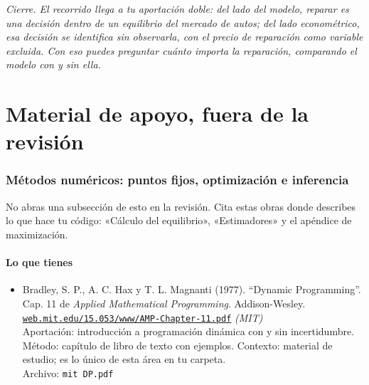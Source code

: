 \documentclass[11pt]{article}
\begin{document}
\medskip
\noindent\textit{Cierre. El recorrido llega a tu aportación doble: del lado del modelo, reparar es una decisión dentro de un equilibrio del mercado de autos; del lado econométrico, esa decisión se identifica sin observarla, con el precio de reparación como variable excluida. Con eso puedes preguntar cuánto importa la reparación, comparando el modelo con y sin ella.}

\part{Material de apoyo, fuera de la revisión}
\section{Métodos numéricos: puntos fijos, optimización e inferencia}
No abras una subsección de esto en la revisión. Cita estas obras donde describes lo que hace tu código: «Cálculo del equilibrio», «Estimadores» y el apéndice de maximización.

\subsection*{Lo que tienes}
\begin{itemize}
\item Bradley, S. P., A. C. Hax y T. L. Magnanti (1977). ``Dynamic Programming''. Cap. 11 de \textit{Applied Mathematical Programming}. Addison-Wesley. \href{https://web.mit.edu/15.053/www/AMP-Chapter-11.pdf}{\texttt{web.mit.edu/15.053/www/AMP-Chapter-11.pdf}} \textit{(MIT)}\\
Aportación: introducción a programación dinámica con y sin incertidumbre. Método: capítulo de libro de texto con ejemplos. Contexto: material de estudio; es lo único de esta área en tu carpeta.\\
{\footnotesize Archivo: \texttt{mit DP.pdf}}
\end{itemize}
\end{document}
